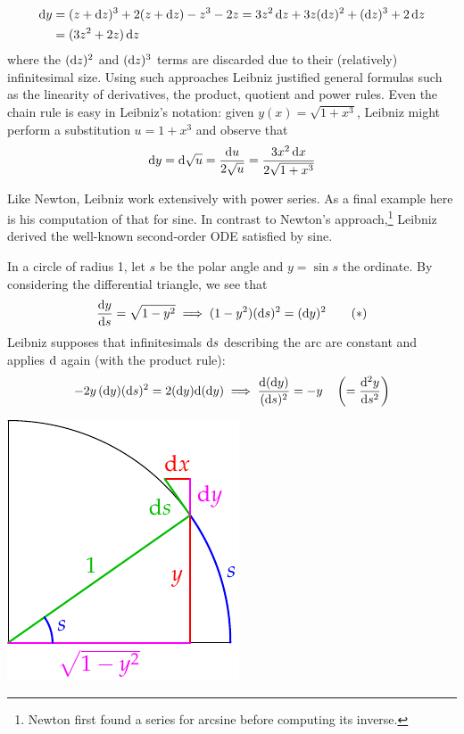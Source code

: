 \begin{align*}
	\dy&=(z+\dz)^3+2(z+\dz) -z^3-2z = 3z^2\,\dz+3z(\dz)^2 +(\dz)^3+2\,\dz\\
	&=(3z^2+2z)\,\dz
\end{align*}
where the $(\dz)^2$ and $(\dz)^3$ terms are discarded due to their (relatively) infinitesimal size. Using such approaches Leibniz justified general formulas such as the linearity of derivatives, the product, quotient and power rules. Even the chain rule is easy in Leibniz's notation: given $y(x)=\sqrt{1+x^3}$, Leibniz might perform a substitution $u=1+x^3$ and observe that
\[
	\dy=\D\sqrt u =\frac{\du}{2\sqrt u} =\frac{3x^2\,\dx}{2\sqrt{1+x^3}}
\]

Like Newton, Leibniz work extensively with power series. As a final example here is his computation of that for sine. In contrast to Newton's approach,\footnote{Newton first found a series for arcsine before computing its inverse.} Leibniz derived the well-known second-order ODE satisfied by sine.\par
\begin{minipage}[t]{0.7\linewidth}\vspace{-4pt}
In a circle of radius 1, let $s$ be the polar angle and $y=\sin s$ the ordinate. By considering the differential triangle, we see that
\[
	\frac{\dy}{\ds} =\sqrt{1-y^2} \implies (1-y^2)(\ds)^2=(\dy)^2 \tag{$\ast$}
\]
Leibniz supposes that infinitesimals $\ds$ describing the arc are constant and applies $\D$ again (with the product rule):\footnotemark
\[
	-2y\,(\dy)(\ds)^2=2(\dy)\D(\dy) \implies \frac{\D(\dy)}{(\ds)^2}=-y \quad \left(=\diff[^2y]{s^2}\right)
\]
\end{minipage}
\hfill
\begin{minipage}[t]{0.29\linewidth}\vspace{-8pt}
	\flushright\includegraphics{leibniz-sine}
\end{minipage}\medbreak


